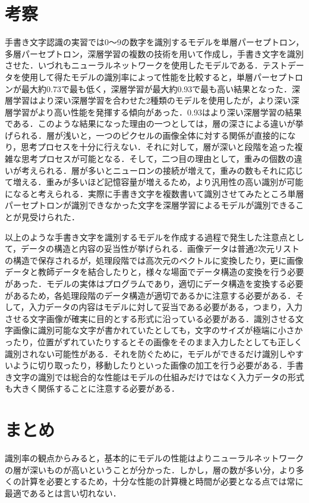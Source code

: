 \documentclass{jlreq}
\begin{document}
\section{考察}
手書き文字認識の実習では0～9の数字を識別するモデルを単層パーセプトロン，多層パーセプトロン，深層学習の複数の技術を用いて作成し，手書き文字を識別させた．いづれもニューラルネットワークを使用したモデルである．テストデータを使用して得たモデルの識別率によって性能を比較すると，単層パーセプトロンが最大約0.73で最も低く，深層学習が最大約0.93で最も高い結果となった．深層学習はより深い深層学習を合わせた2種類のモデルを使用したが，より深い深層学習がより高い性能を発揮する傾向があった．0.93はより深い深層学習の結果である．このような結果になった理由の一つとしては，層の深さによる違いが挙げられる．層が浅いと，一つのピクセルの画像全体に対する関係が直接的になり，思考プロセスを十分に行えない．それに対して，層が深いと段階を追った複雑な思考プロセスが可能となる．そして，二つ目の理由として，重みの個数の違いが考えられる．層が多いとニューロンの接続が増えて，重みの数もそれに応じて増える．重みが多いほど記憶容量が増えるため，より汎用性の高い識別が可能になると考えられる．実際に手書き文字を複数書いて識別させてみたところ単層パーセプトロンが識別できなかった文字を深層学習によるモデルが識別できることが見受けられた．

以上のような手書き文字を識別するモデルを作成する過程で発生した注意点として，データの構造と内容の妥当性が挙げられる．画像データは普通2次元リストの構造で保存されるが，処理段階では高次元のベクトルに変換したり，更に画像データと教師データを結合したりと，様々な場面でデータ構造の変換を行う必要があった．モデルの実体はプログラムであり，適切にデータ構造を変換する必要があるため，各処理段階のデータ構造が適切であるかに注意する必要がある．そして，入力データの内容はモデルに対して妥当である必要がある，つまり，入力させる文字画像が確実に目的とする形式に沿っている必要がある．識別させる文字画像に識別可能な文字が書かれていたとしても，文字のサイズが極端に小さかったり，位置がずれていたりするとその画像をそのまま入力したとしても正しく識別されない可能性がある．それを防ぐために，モデルができるだけ識別しやすいように切り取ったり，移動したりといった画像の加工を行う必要がある．手書き文字の識別では総合的な性能はモデルの仕組みだけではなく入力データの形式も大きく関係することに注意する必要がある．

\section{まとめ}
識別率の観点からみると，基本的にモデルの性能はよりニューラルネットワークの層が深いものが高いということが分かった．しかし，層の数が多い分，より多くの計算を必要とするため，十分な性能の計算機と時間が必要となる点では常に最適であるとは言い切れない．
\end{document}
